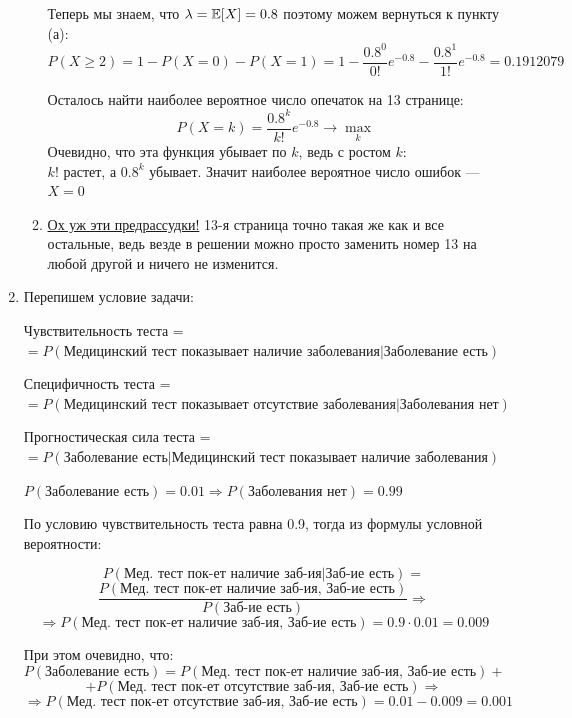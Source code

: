 \documentclass[12pt, a4paper]{article}\usepackage[]{graphicx}\usepackage[]{color}
\begin{document}
\begin{enumerate}
\begin{enumerate}
Теперь мы знаем, что $\lambda = \mathbb{E}[X] = 0.8$ поэтому можем вернуться к пункту (а):
$$
P(X \geqslant 2) = 1 - P(X=0) - P(X=1)  = 1 - \frac{0.8^0}{0!}e^{-0.8} - \frac{0.8^1}{1!}e^{-0.8} = 0.1912079
$$ \vspace{-1.2cm}

\hspace{13cm} 

Осталось найти наиболее вероятное число опечаток на 13 странице:
$$
P(X=k) = \frac{0.8^k}{k!}e^{-0.8} \rightarrow \max \limits_k
$$
Очевидно, что эта функция убывает по $k$, ведь с ростом $k$:\\
 $k!$ растет, а $0.8^k$ убывает. Значит наиболее вероятное число ошибок — $X = 0$


\item \href{https://en.wikipedia.org/wiki/Triskaidekaphobia}{Ох уж эти предрассудки!} 13-я страница точно такая же как и все остальные, ведь везде в решении можно просто заменить номер 13 на любой другой и ничего не изменится.

\end{enumerate}

\item
Перепишем условие задачи:

Чувствительность теста = \\$=P(\text{Медицинский тест показывает наличие заболевания} | \text{Заболевание есть})$

Специфичность теста = \\$=P(\text{Медицинский тест показывает отсутствие заболевания} | \text{Заболевания нет})$

Прогностическая сила теста = \\$=P(\text{Заболевание есть} | \text{Медицинский тест показывает наличие заболевания})$

$P(\text{Заболевание есть}) = 0.01 \Rightarrow P(\text{Заболевания нет}) = 0.99 $

По условию чувствительность теста равна 0.9, тогда из формулы условной вероятности:

$$P(\text{Мед. тест пок-ет наличие заб-ия} | \text{Заб-ие есть}) = $$
$$\dfrac{P(\text{Мед. тест пок-ет наличие заб-ия, Заб-ие есть})}{P(\text{Заб-ие есть})} \Rightarrow$$
$$\Rightarrow P(\text{Мед. тест пок-ет наличие заб-ия, Заб-ие есть}) = 0.9 \cdot 0.01 = 0.009$$

При этом очевидно, что:
$$P(\text{Заболевание есть}) = P(\text{Мед. тест пок-ет наличие заб-ия, Заб-ие есть}) + $$
$$+ P(\text{Мед. тест пок-ет отсутствие заб-ия, Заб-ие есть}) \Rightarrow$$
$$\Rightarrow P(\text{Мед. тест пок-ет отсутствие заб-ия, Заб-ие есть}) = 0.01 - 0.009 = 0.001$$


\end{enumerate}
\end{document}
